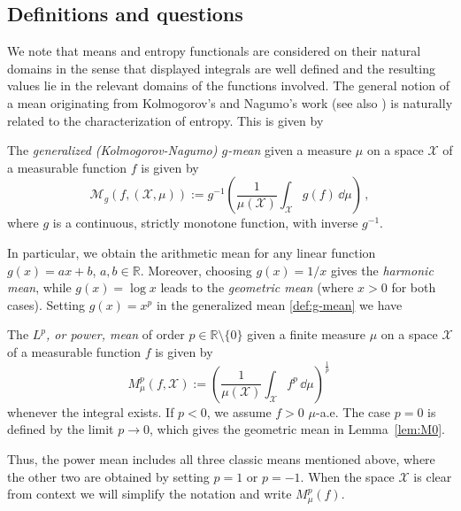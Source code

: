 \documentclass[reqno]{amsart}
\begin{document}
\subsection{Definitions and questions}
We note that means and entropy functionals are considered on their natural domains in the sense that displayed integrals are well defined and the resulting values lie in the relevant domains of the functions involved.
The general notion of a mean originating from Kolmogorov's and Nagumo's work \cite{Kol30,Nagumo1930} (see also  \cite{Aczel48, HarLitPol52, Bullen2003, deCar16})  is naturally related to the characterization of entropy. This is given by
\begin{definition}
\label{def:g-mean}
The {\it generalized (Kolmogorov-Nagumo) $g$-mean} given a measure $\mu$ on a space $\mathcal{X}$ of a measurable function $f$ is given by 
\begin{equation}
 \label{eq:mean-g}
\mathcal{M}_g (f, (\mathcal{X},\mu)) := g^{-1}\left(   \dfrac{1}{\mu(\mathcal{X})} \int_\mathcal{X}  g(f) \, \dd \mu \right) \, ,
\end{equation}
where $g$  is a continuous, strictly monotone function, with inverse $g^{-1}$.
\end{definition}

In particular, we obtain the arithmetic mean for any linear function $g(x) =ax+b$, $a,b \in \mathbb{R}$. Moreover, choosing $g(x) = 1/x$ gives the \textit{harmonic mean}, while $g(x) = \log x$ leads to the \textit{geometric mean} (where $x>0$ for both cases). Setting $g(x) = x^p$ in the generalized mean \eqref{def:g-mean} we have
\begin{definition}
\label{def:Lp-mean}
The {\it $L^p$, or power, mean} of order $p \in \mathbb{R}\setminus \{0\}$ given a finite measure $\mu$ on a space $\mathcal{X}$ of a measurable function $f$ is given by 
\begin{equation}
\label{eq:Lp-mean}
M^p_\mu (f, \mathcal{X}) := \left(   \dfrac{1}{\mu(\mathcal{X})} \int_{\mathcal{X}}  f^p \, \dd \mu \right)^{\frac{1}{p}} \, 
\end{equation}
whenever the integral exists. 
If $p<0$, we assume $f>0$ $\mu$-a.e.
The case $p=0$ is defined by the limit $p \rightarrow 0$, which gives the geometric mean in Lemma~\ref{lem:M0}.
\end{definition}
Thus, the power mean includes all three classic means mentioned above, where the other two are obtained by setting $p=1$ or $p=-1$.
When the space $\mathcal{X}$ is clear from context we will simplify the notation and write $M^p_\mu (f)$. 
\end{document}
